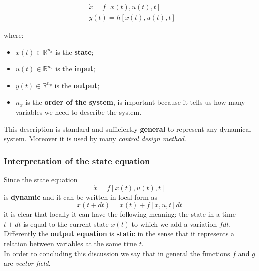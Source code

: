     \begin{align}    
        &\dot{x}=f[x(t), u(t), t]\\
        &y(t)=h[x(t), u(t), t]
    \end{align}

where: 
\begin{itemize}
    \setlength\itemsep{0em}
    \item $x(t)\in\mathbb{R}^{n_x}$ is the \textbf{state}; 
    \item $u(t) \in\mathbb{R}^{n_u}$ is the \textbf{input}; 
    \item $y(t) \in\mathbb{R}^{n_y}$ is the \textbf{output}; 
    \item $n_x$ is the \textbf{order of the system}, is important because it tells us how many variables we need to describe the system.
\end{itemize}

This description is standard and sufficiently \textbf{general} to represent any dynamical system. Moreover it is used by many \textit{control design method}.

\subsubsection*{Interpretation of the state equation}
Since the state equation $$\dot{x}=f[x(t),u(t),t]$$ is \textbf{dynamic} and it can be written in local form as $$x(t+dt)=x(t)+f[x,u,t]dt$$ it is clear that locally it can have the following meaning: the state in a time $t+dt$ is equal to the current state $x(t)$ to which we add a variation $fdt$.\\
Differently the \textbf{output equation} is \textbf{static} in the sense that it represents a relation between variables at the same time $t$.\\
In order to concluding this discussion we say that in general the functions $f$ and $g$ are \textit{vector field}.


